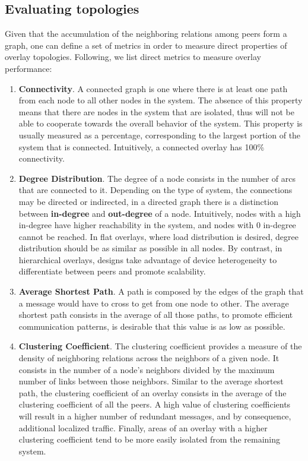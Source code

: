 \subsection{Evaluating topologies}

Given that the accumulation of the neighboring relations among peers form a graph, one can define a set of metrics in order to measure direct properties of overlay topologies. Following, we list direct metrics to measure overlay performance:

\begin{enumerate}
    
    \item \textbf{Connectivity}. A connected graph is one where there is at least one path from each node to all other nodes in the system. The absence of this property means that there are nodes in the system that are isolated, thus will not be able to cooperate towards the overall behavior of the system. This property is usually measured as a percentage, corresponding to the largest portion of the system that is connected. Intuitively, a  connected overlay has 100\% connectivity.
    
    \item \textbf{Degree Distribution}. The degree of a node consists in the number of arcs that are connected to it. Depending on the type of system, the connections may be directed or indirected, in a directed graph there is a distinction between \textbf{in-degree} and \textbf{out-degree} of a node. Intuitively, nodes with a high in-degree have higher reachability in the system, and nodes with 0 in-degree cannot be reached. In flat overlays, where load distribution is desired, degree distribution should be as similar as possible in all nodes. By contrast, in hierarchical overlays,  designs take advantage of device heterogeneity to differentiate between peers and promote scalability.
    
    \item \textbf{Average Shortest Path}. A path is composed by the edges of the graph that a message would have to cross to get from one node to other. The average shortest path consists in the average of all those paths, to promote efficient communication patterns, is desirable that this value is as low as possible.
    
    \item \textbf{Clustering Coefficient}. The clustering coefficient provides a measure of the density of neighboring relations across the neighbors of a given node. It consists in the number of a node's neighbors divided by the maximum number of links between those neighbors. Similar to the average shortest path, the clustering coefficient of an overlay consists in the average of the clustering coefficient of all the peers. A high value of clustering coefficients will result in a higher number of redundant messages, and by consequence, additional localized traffic. Finally, areas of an overlay with a higher clustering coefficient tend to be more easily isolated from the remaining system.
    

\end{enumerate}
